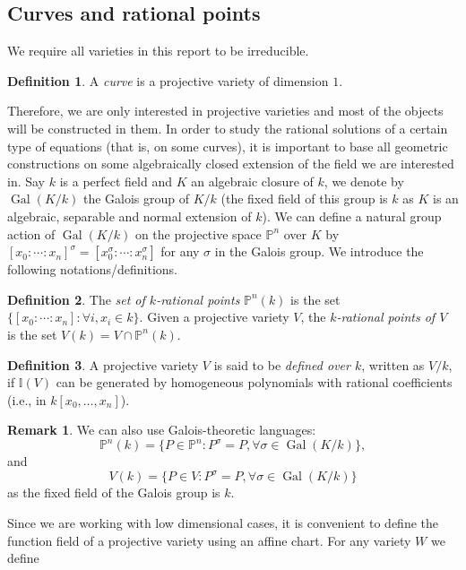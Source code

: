 \documentclass[12pt]{article}
\theoremstyle{remark}
\theoremstyle{definition}
\newtheorem{remark}{Remark}[subsection]
\newtheorem{definition}{Definition}[subsection]
\newcommand{\s}[0]{\sigma}
\newcommand{\Gal}[0]{\operatorname{Gal}}
\begin{document}
	\subsection{Curves and rational points}\label{sec-rat}
        We require all varieties in this report to be irreducible.
        \begin{definition}\label{def-curve}
            A \textit{curve} is a projective variety of dimension $1$.
        \end{definition}
        \noindent Therefore, we are only interested in projective varieties and most of the objects will be constructed in them. In order to study the rational solutions of a certain type of equations (that is, on some curves), it is important to base all geometric constructions on some algebraically closed extension of the field we are interested in. Say $k$ is a perfect field and $K$ an algebraic closure of $k$, we denote by $\Gal(K/k)$ the Galois group of $K/k$ (the fixed field of this group is $k$ as $K$ is an algebraic, separable and normal extension of $k$). We can define a natural group action of $\Gal(K/k)$ on the projective space $\mathbb P^n$ over $K$ by $[x_0:\cdots: x_n]^\sigma =[x_0^\sigma:\cdots: x_n^\sigma]$ for any $\sigma$ in the Galois group. We introduce the following notations/definitions.
        \begin{definition}
            The \textit{set of $k$-rational points} $\mathbb P^n(k)$ is the set $\{[x_0:\cdots:x_n]: \forall i, x_i\in k\}$. Given a projective variety $V$, the \textit{$k$-rational points of $V$} is the set $V(k)=V\cap \mathbb P^n(k)$.
        \end{definition}
        \begin{definition}
            A projective variety $V$ is said to be \textit{defined over $k$}, written as $V/k$, if $\mathbb I(V)$ can be generated by homogeneous polynomials with rational coefficients (i.e., in $k[x_0,\dots, x_n]$).
        \end{definition}
        \begin{remark}
            We can also use Galois-theoretic languages:
            \[\mathbb P^n(k)=\{P\in \mathbb P^n:P^\s = P,\forall\s \in\Gal(K/k)\},\]
            and
            \[V(k)=\{P\in V:P^\s = P,\forall\s \in\Gal(K/k)\}\]
            as the fixed field of the Galois group is $k$.
        \end{remark}
        Since we are working with low dimensional cases, it is convenient to define the function field of a projective variety using an affine chart. For any variety $W$ we define 
\end{document}
